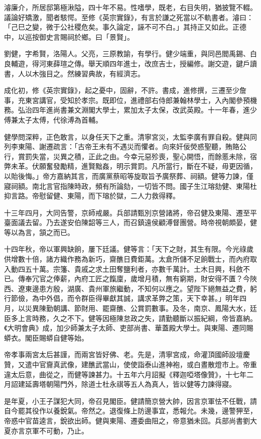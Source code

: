 \begin{pinyinscope}
濬廉介，所居邸第極湫隘，四十年不易。性嗜學，既老，右目失明，猶披覽不輟。議論好矯激，聞者駭愕。至修《英宗實錄》，有言於謙之死當以不軌書者。濬曰：「己巳之變，微于公社稷危矣。事久論定，誣不可不白。」其持正又如此。正德中，以巡按御史言賜祠於鄉。曰「景賢」。

劉健，字希賢，洛陽人。父亮，三原教諭，有學行。健少端重，與同邑閻禹錫、白良輔遊，得河東薛瑄之傳。舉天順四年進士，改庶吉士，授編修。謝交遊，鍵戶讀書，人以木強目之。然練習典故，有經濟志。

成化初，修《英宗實錄》，起之憂中，固辭，不許。書成，進修撰，三遷至少詹事，充東宮講官，受知於孝宗。既即位，進禮部右侍郎兼翰林學士，入內閣參預機務。弘治四年進尚書兼文淵閣大學士，累加太子太保，改武英殿。十一年春，進少傅兼太子太傅，代徐溥為首輔。

健學問深粹，正色敢言，以身任天下之重。清寧宮災，太監李廣有罪自殺。健與同列李東陽、謝遷疏言：「古帝王未有不遇災而懼者。向來奸佞熒惑聖聽，賄賂公行，賞罰失當，災異之積，正此之由。今幸元惡殄喪，聖心開悟，而餘慝未除，宿弊未革。伏願奮發勵精，進賢黜姦，明示賞罰。凡所當行，斷在不疑，毋更因循，以貽後悔。」帝方嘉納其言，而廣黨蔡昭等旋取旨予廣祭葬、祠額。健等力諫，僅寢祠額。南北言官指陳時政，頻有所論劾，一切皆不問。國子生江瑢劾健、東陽杜抑言路。帝慰留健、東陽，而下瑢於獄，二人力救得釋。

十三年四月，大同告警，京師戒嚴。兵部請甄別京營諸將，帝召健及東陽、遷至平臺面議去留。乃去遂安伯陳韶等三人，而召鎮遠侯顧溥督團營。時帝視朝頗晏，健等以為言，頷之而已。

十四年秋，帝以軍興缺餉，屢下廷議。健等言：「天下之財，其生有限。今光祿歲供增數十倍，諸方織作務為新巧，齋醮日費鉅萬。太倉所儲不足餉戰士，而內府取入動四五十萬。宗籓、貴戚之求土田奪鹽利者，亦數千萬計。土木日興，科斂不已。傳奉冗官之俸薪，內府工匠之餼廩，歲增月積，無有窮期，財安得不匱？今陜西、遼東邊患方殷，湖廣、貴州軍旅繼動，不知何以應之。望陛下絕無益之費，躬行節儉，為中外倡，而令群臣得畢獻其誠，講求革弊之策，天下幸甚。」明年四月，以災異陳勤朝講、節財用、罷齋醮、公賞罰數事。及冬，南京、鳳陽大水，廷臣多上言時務，久之不下。健等因極陳怠政之失，請勤聽斷以振紀綱，帝皆嘉納。《大明會典》成，加少師兼太子太師、吏部尚書、華蓋殿大學士。與東陽、遷同賜蟒衣。閣臣賜蟒自健等始。

帝孝事兩宮太后甚謹，而兩宮皆好佛、老。先是，清寧宮成，命灌頂國師設壇慶贊，又遣中官齎真武像，建醮武當山，使使詣泰山進神袍，或白晝散燈市上。帝重違太后意，曲從之，而健等諫甚力。十五年六月詔擬《釋迦啞塔像贊》，十七年二月詔建延壽塔朝陽門外，除道士杜永祺等五人為真人，皆以健等力諫得寢。

是年夏，小王子謀犯大同，帝召見閣臣。健請簡京營大帥，因言京軍怯不任戰，請自今罷其役作以養銳氣。帝然之。退復條上防邊事宜，悉報允。未幾，邊警狎至，帝惑中官苗逵言，銳欲出師。健與東陽、遷委曲阻之，帝意猶未回。兵部尚書劉大夏亦言京軍不可動，乃止。


\end{pinyinscope}
